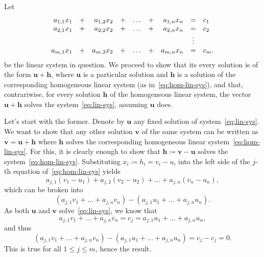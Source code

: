 \begin{thmproof}
 Let
 \begin{equation}
  \label{eq:lin-sys}
  \begin{array}{r c r c c c r c l}
   a_{1,1}x_1 & + & a_{1,2}x_2 & + & \ldots & + & a_{1,n}x_n & = & c_1\\
   a_{2,1}x_1 & + & a_{2,2}x_2 & + & \ldots & + & a_{2,n}x_n & = & c_2\\
             &   &           &   &        &   &           & \vdots & \\
   a_{m,1}x_1 & + & a_{m,2}x_2 & + & \ldots & + & a_{m,n}x_n & = & c_m.
  \end{array}
 \end{equation}
 be the linear system in question. We proceed to show that its every solution is
 of the form $\mathbf{u} + \mathbf{h}$, where $\mathbf{u}$ is a particular
 solution and $\mathbf{h}$ is a solution of the corresponding homogeneous linear
 system (as in~\eqref{eq:hom-lin-sys}), and that, contrariwise, for every
 solution $\mathbf{h}$ of the homogeneous linear system, the vector $\mathbf{u}
 + \mathbf{h}$ solves the system~\eqref{eq:lin-sys}, assuming $\mathbf{u}$ does.

 Let's start with the former. Denote by $\mathbf{u}$ any fixed solution of
 system~\eqref{eq:lin-sys}. We want to show that any other solution $\mathbf{v}$
 of the same system can be written as $\mathbf{v} = \mathbf{u} + \mathbf{h}$
 where $\mathbf{h}$ solves the corresponding homogeneous linear
 system~\eqref{eq:hom-lin-sys}. For this, it is clearly enough to show that
 $\mathbf{h} \coloneqq \mathbf{v} - \mathbf{u}$ solves the
 system~\eqref{eq:hom-lin-sys}. Substituting $x_i \coloneqq h_i = v_i - u_i$
 into the left side of the $j$-th equation of~\eqref{eq:hom-lin-sys} yields
 \[
  a_{j,1}(v_1 - u_1) + a_{j,2}(v_2 - u_2) + \ldots + a_{j,n}(v_n - u_n),
 \]
 which can be broken into
 \[
  (a_{j,1}v_1 + \ldots + a_{j,n}v_n) - (a_{j,1}u_1 + \ldots + a_{j,n}u_n).
 \]
 As both $\mathbf{u}$ and $\mathbf{v}$ solve~\eqref{eq:lin-sys}, we know that
 \[
  a_{j,1}v_1 + \ldots + a_{j,n}v_n = c_j = a_{j,1}u_1 + \ldots + a_{j,n}u_n,
 \]
 and thus
 \[
  (a_{j,1}v_1 + \ldots + a_{j,n}v_n) - (a_{j,1}u_1 + \ldots + a_{j,n}u_n) = c_j
  - c_j = 0.
 \]
 This is true for all $1 \leq j \leq m$, hence the result.


\end{thmproof}

